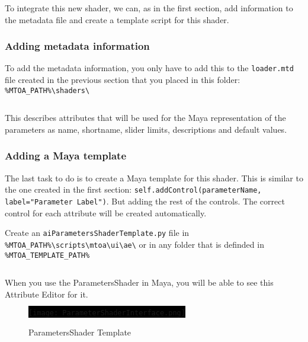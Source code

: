 To integrate this new shader, we can, as in the first section, add information to the
metadata file and create a template script for this shader.

\subsubsection{Adding metadata information}

To add the metadata information, you only have to add this to the \texttt{loader.mtd} file created in the previous section that you placed in this folder:\\
\verb|%MTOA_PATH%\shaders\|\\

\inputminted[mathescape,
linenos,
numbersep=5pt,
frame=lines,
framesep=2mm,
baselinestretch=1,
fontsize=\footnotesize,
tabsize=3,
label=loader.mtd,
firstline=25,
firstnumber=25]
{mtd}{loader2.mtd}

This describes attributes that will be used for the Maya representation of the parameters as name,
shortname, slider limits, descriptions and default values.

\subsubsection{Adding a Maya template}

The last task to do is to create a Maya template for this shader. This is similar to the one created
in the first section: \texttt{self.addControl(parameterName, label="Parameter Label")}.
But adding the rest of the controls. The correct control for each attribute will
be created automatically.

Create an \texttt{aiParametersShaderTemplate.py} file in\\
\verb|%MTOA_PATH%\scripts\mtoa\ui\ae\| or in any folder that is definded in \verb|%MTOA_TEMPLATE_PATH%|
\\

\inputminted[mathescape,
linenos,
numbersep=5pt,
frame=lines,
framesep=2mm,
baselinestretch=1,
fontsize=\footnotesize,
tabsize=3,
label=aiParametersShaderTemplate.py]
{python}{aiParametersShaderTemplate.py}

When you use the ParametersShader in Maya, you will be able to see this Attribute Editor for it.

\begin{figure}[H]
\centering
\colorbox{black}{\texttt{[image: ParameterShaderInterface.png]}}
\caption{ParametersShader Template}
\label{ParametersShaderTemplate}
\end{figure}

